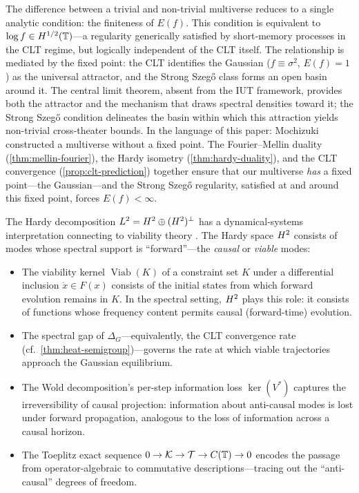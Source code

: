 \begin{remark}
The difference between a trivial and non-trivial multiverse reduces to a single analytic condition: the finiteness of $E(f)$. This condition is equivalent to $\log f \in H^{1/2}(\mathbb{T})$---a regularity generically satisfied by short-memory processes in the CLT regime, but logically independent of the CLT itself. The relationship is mediated by the fixed point: the CLT identifies the Gaussian ($f \equiv \sigma^2$, $E(f) = 1$) as the universal attractor, and the Strong Szeg\H{o} class forms an open basin around it. The central limit theorem, absent from the IUT framework, provides both the attractor and the mechanism that draws spectral densities toward it; the Strong Szeg\H{o} condition delineates the basin within which this attraction yields non-trivial cross-theater bounds. In the language of this paper: Mochizuki constructed a multiverse without a fixed point. The Fourier--Mellin duality (\cref{thm:mellin-fourier}), the Hardy isometry (\cref{thm:hardy-duality}), and the CLT convergence (\cref{prop:clt-prediction}) together ensure that our multiverse \emph{has} a fixed point---the Gaussian---and the Strong Szeg\H{o} regularity, satisfied at and around this fixed point, forces $E(f) < \infty$.
\end{remark}

\begin{remark}
The Hardy decomposition $L^2 = H^2 \oplus (H^2)^\perp$ has a dynamical-systems interpretation connecting to viability theory \cite{Aubin}. The Hardy space $H^2$ consists of modes whose spectral support is ``forward''---the \emph{causal} or \emph{viable} modes:
\begin{itemize}
\item The viability kernel $\operatorname{Viab}(K)$ of a constraint set $K$ under a differential inclusion $\dot{x} \in F(x)$ \cite[Chapter~4]{Aubin} consists of the initial states from which forward evolution remains in $K$. In the spectral setting, $H^2$ plays this role: it consists of functions whose frequency content permits causal (forward-time) evolution.
\item The spectral gap of $\Delta_G$---equivalently, the CLT convergence rate (cf.\ \cref{thm:heat-semigroup})---governs the rate at which viable trajectories approach the Gaussian equilibrium.
\item The Wold decomposition's per-step information loss $\ker(V^*)$ captures the irreversibility of causal projection: information about anti-causal modes is lost under forward propagation, analogous to the loss of information across a causal horizon.
\item The Toeplitz exact sequence $0 \to \mathcal{K} \to \mathcal{T} \to C(\mathbb{T}) \to 0$ encodes the passage from operator-algebraic to commutative descriptions---tracing out the ``anti-causal'' degrees of freedom.
\end{itemize}
\end{remark}

